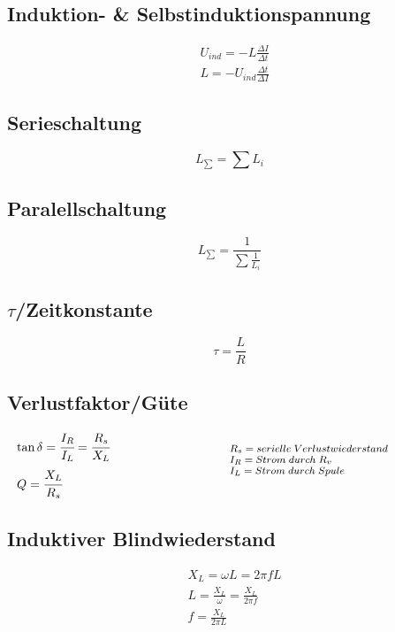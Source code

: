 \documentclass[12pt,a5paper,ngerman,titlepage]{article}
\begin{document}
\subsection{Induktion- \& Selbstinduktionspannung}
\begin{align*}
&U_{ind}=-L\frac{\Delta I}{\Delta t} \\[5pt]
&L = -U_{ind}\frac{\Delta t}{\Delta I}
\end{align*}

\subsection{Serieschaltung}
$$L_{\sum} = \sum L_{i}$$

\subsection{Paralellschaltung}
$$L_{\sum} = \frac{1}{\sum \frac{1}{L_{i}}}$$

\subsection{$\tau$/Zeitkonstante}

$$\tau = \frac{L}{R}$$


\subsection{Verlustfaktor/Güte}
\[
\begin{minipage}{.5\linewidth}
	
  $\tan \delta = \cfrac{I_{R}}{I_{L}} = \cfrac{R_{s}}{X_{L}}$\\[5pt]
  $Q = \cfrac{X_{L}}{R_{s}}$
\end{minipage}%
\begin{minipage}{.5\linewidth}
  \fontsize{8pt}{9pt}\selectfont
  $R_{s} = serielle \; Verlustwiederstand$ \\
  $I_{R} = Strom \; durch \; R_{v}$ \\
  $I_{L} = Strom \; durch \; Spule$ \\

\end{minipage}
\]
\subsection{Induktiver Blindwiederstand}
\begin{align*}
&X_{L} = \omega L=2\pi fL \\[5pt]
&L = \frac{X_{L}}{\omega} = \frac{X_{L}}{2\pi f} \\[5pt]
&f = \frac{X_{L}}{2\pi L}
\end{align*}
\newpage
\end{document}
